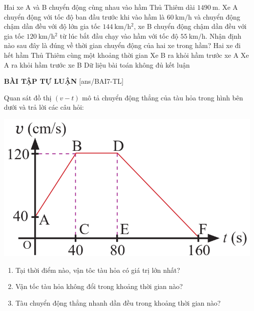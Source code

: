 \begin{ex}
	Hai xe A và B chuyển động cùng nhau vào hầm Thủ Thiêm dài $\SI{1490}{\meter}$. Xe A chuyển động với tốc độ ban đầu trước khi vào hầm là $\SI{60}{\kilo\meter/\hour}$ và chuyển động chậm dần đều với độ lớn gia tốc $\SI{144}{\kilo\meter/\hour^2}$, xe B chuyển động chậm dần đều với gia tốc $\SI{120}{\kilo\meter/\hour^2}$	từ lúc bắt đầu chạy vào hầm với tốc độ $\SI{55}{\kilo\meter/\hour}$. Nhận định nào sau đây là đúng về thời gian chuyển động của hai xe trong hầm?
	\choice
	{Hai xe đi hết hầm Thủ Thiêm cùng một khoảng thời gian}
	{Xe B ra khỏi hầm trước xe A}
	{\True Xe A ra khỏi hầm trước xe B}
	{Dữ liệu bài toán không đủ kết luận}
	\loigiai{}
\end{ex}
\textbf{BÀI TẬP TỰ LUẬN}
[ans/BAI7-TL]
\setcounter{ex}{0}
\begin{ex}
	Quan sát đồ thị $\left(v-t\right)$ mô tả chuyển động thẳng của tàu hỏa trong hình bên dưới và trả lời các câu hỏi:
	\begin{center}
		\includegraphics[scale=0.4]{figs/BAI7-1}
	\end{center}
	\begin{enumerate}[label=\alph*)]
		\item Tại thời điểm nào, vận tôc tàu hỏa có giá trị lớn nhất?
		\item Vận tốc tàu hỏa không đổi trong khoảng thời gian nào?
		\item Tàu chuyển động thẳng nhanh dần đều trong khoảng thời gian nào?
	\end{enumerate}
	\loigiai{}
\end{ex}

